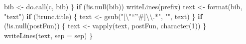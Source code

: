 \documentclass[
]{article}
\newenvironment{Shaded}{\begin{snugshade}}{\end{snugshade}}
\newcommand{\AttributeTok}[1]{\textcolor[rgb]{0.77,0.63,0.00}{#1}}
\newcommand{\ControlFlowTok}[1]{\textcolor[rgb]{0.13,0.29,0.53}{\textbf{#1}}}
\newcommand{\DecValTok}[1]{\textcolor[rgb]{0.00,0.00,0.81}{#1}}
\newcommand{\FunctionTok}[1]{\textcolor[rgb]{0.00,0.00,0.00}{#1}}
\newcommand{\NormalTok}[1]{#1}
\newcommand{\OtherTok}[1]{\textcolor[rgb]{0.56,0.35,0.01}{#1}}
\newcommand{\SpecialCharTok}[1]{\textcolor[rgb]{0.00,0.00,0.00}{#1}}
\newcommand{\StringTok}[1]{\textcolor[rgb]{0.31,0.60,0.02}{#1}}
\begin{document}
\begin{Shaded}
\begin{Highlighting}[]
\NormalTok{    bib }\OtherTok{\textless{}{-}} \FunctionTok{do.call}\NormalTok{(c, bib)}
\NormalTok{  \}}
  \ControlFlowTok{if}\NormalTok{ (}\SpecialCharTok{!}\FunctionTok{is.null}\NormalTok{(bib))}
    \FunctionTok{writeLines}\NormalTok{(prefix)}
\NormalTok{  text }\OtherTok{\textless{}{-}} \FunctionTok{format}\NormalTok{(bib, }\StringTok{"text"}\NormalTok{)}
  \ControlFlowTok{if}\NormalTok{ (}\SpecialCharTok{!}\NormalTok{trunc.title) \{}
\NormalTok{    text }\OtherTok{\textless{}{-}} \FunctionTok{gsub}\NormalTok{(}\StringTok{"[}\SpecialCharTok{\textbackslash{}"}\StringTok{“”\#]}\SpecialCharTok{\textbackslash{}\textbackslash{}}\StringTok{.*"}\NormalTok{, }\StringTok{""}\NormalTok{, text)}
\NormalTok{  \}}
  \ControlFlowTok{if}\NormalTok{ (}\SpecialCharTok{!}\FunctionTok{is.null}\NormalTok{(postFun)) \{}
\NormalTok{    text }\OtherTok{\textless{}{-}} \FunctionTok{vapply}\NormalTok{(text, postFun, }\FunctionTok{character}\NormalTok{(}\DecValTok{1}\NormalTok{))}
\NormalTok{  \}}
  \FunctionTok{writeLines}\NormalTok{(text, }\AttributeTok{sep =}\NormalTok{ sep)}
\NormalTok{\}}


\end{Highlighting}
\end{Shaded}
\end{document}
